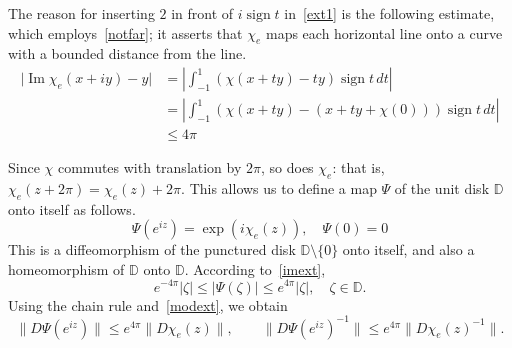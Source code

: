 \documentclass[11pt]{amsart}
\theoremstyle{remark}
\numberwithin{equation}{section}
\newcommand{\DD}{\mathbb{D}}
\newcommand{\abs}[1]{\lvert#1\rvert}
\newcommand{\norm}[1]{\lVert#1\rVert}
\DeclareMathOperator{\im}{Im}
\DeclareMathOperator{\sgn}{sign}
\begin{document}
The reason for inserting $2$ in front of $i\sgn t$ in~\eqref{ext1} is the following estimate, which employs~\eqref{notfar}; it asserts that $\chi_e$ maps each horizontal line onto a curve with a bounded distance from the line. 
\begin{equation}\label{imext}
\begin{split}
\abs{\im \chi_e(x+iy) - y} & = \left|\int_{-1}^{1} (\chi(x+ty) - ty) \sgn t \,dt\right|    \\
&= \left | \int_{-1}^{1} (\chi(x+ty) - (x+ty + \chi(0))) \sgn t \,dt \right|\\
& \le 4\pi  
\end{split}
\end{equation}

Since $\chi$ commutes with translation by $2\pi$, so does $\chi_e$: that is, $\chi_e(z+2\pi)=\chi_e(z)+2\pi$. This allows us to define a map $\Psi$ of the unit disk $\DD$ onto itself as follows.
\begin{equation}\label{halfplane2disk}
\Psi(e^{iz}) = \exp(i \chi_e(z)),\quad  \Psi(0)=0
\end{equation}
This is a diffeomorphism of the punctured disk $\DD\setminus \{0\}$ onto itself, and also a homeomorphism of $\DD$ onto $\DD$. According to~\eqref{imext}, 
\begin{equation}\label{modext}
e^{-4\pi}\abs{\zeta}\le \abs{\Psi(\zeta)} \le e^{4\pi}\abs{\zeta},\quad \zeta\in\DD.
\end{equation}
Using the chain rule and~\eqref{modext}, we obtain 
\begin{equation}\label{chainPsi}
\norm{D\Psi(e^{iz})} \le e^{4\pi} \norm{ D\chi_e(z)},\qquad 
\norm{D\Psi(e^{iz})^{-1} } \le e^{4\pi} \norm{ D\chi_e(z)^{-1}}.
\end{equation}
\end{document}
